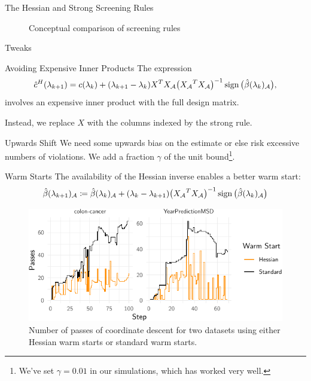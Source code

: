 \begin{frame}{The Hessian and Strong Screening Rules}
  \begin{figure}
    
    \caption{Conceptual comparison of screening rules}
  \end{figure}
\end{frame}

\begin{frame}{Tweaks}
  \begin{block}{Avoiding Expensive Inner Products}
    The expression
    \begin{equation*}
      \hat c^H(\lambda_{k+1})
      = c(\lambda_k) + (\lambda_{k+1} - \lambda_k)X^T {X_\mathcal{A}}
      \big({X_\mathcal{A}}^T{X_\mathcal{A}}\big)^{-1}
      \operatorname{sign}\big(\hat\beta(\lambda_k)_\mathcal{A}\big),
    \end{equation*}
    involves an expensive inner product with the full design matrix.
    \medskip

    Instead, we replace \(X\) with the columns indexed by the strong rule.
  \end{block}

  \pause

  \begin{block}{Upwards Shift}
    We need some upwards bias on the estimate or else risk excessive numbers of
    violations. We add a fraction \(\gamma\) of the unit bound\footnote{We've
      set \(\gamma = 0.01\) in our simulations, which has worked very well.}.
  \end{block}

\end{frame}

\begin{frame}{Warm Starts}
  The availability of the Hessian inverse enables a better warm start:
  \[
    \hat\beta(\lambda_{k+1})_\mathcal{A} \coloneqq
    \hat\beta(\lambda_k)_\mathcal{A} +
    (\lambda_k - \lambda_{k+1}) \big({X_\mathcal{A}}^T{X_\mathcal{A}}\big)^{-1}
    \operatorname{sign}\big(\hat\beta(\lambda_k)_\mathcal{A}\big)
  \]
  \pause
  \begin{figure}
    \centering
    \includegraphics{figures/hessian-warm-starts}
    \caption{Number of passes of coordinate descent for two datasets
      using either Hessian warm
      starts or standard warm starts.}
  \end{figure}

\end{frame}

